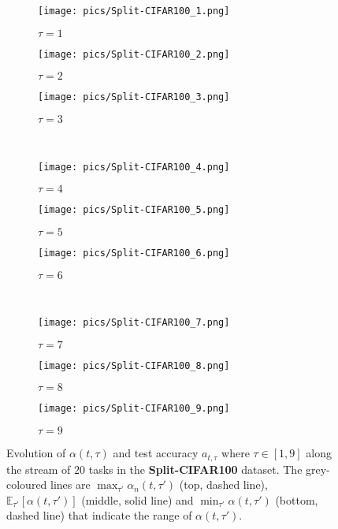 \documentclass{article} \usepackage{collas2022_conference,times}
\begin{document}
    \begin{figure*}[t!]
        \centering
        \begin{subfigure}[b]{0.32\textwidth}
            \texttt{[image: pics/Split-CIFAR100\_1.png]}\caption{$\tau=1$}
        \end{subfigure}
        \hfill
        \begin{subfigure}[b]{0.32\textwidth}
            \texttt{[image: pics/Split-CIFAR100\_2.png]}\caption{$\tau=2$}
        \end{subfigure}
        \hfill
        \begin{subfigure}[b]{0.32\textwidth}
            \texttt{[image: pics/Split-CIFAR100\_3.png]}\caption{$\tau=3$}
        \end{subfigure}
        \\
        \begin{subfigure}[b]{0.32\textwidth}
            \texttt{[image: pics/Split-CIFAR100\_4.png]}\caption{$\tau=4$}
        \end{subfigure}
        \hfill
        \begin{subfigure}[b]{0.32\textwidth}
            \texttt{[image: pics/Split-CIFAR100\_5.png]}\caption{$\tau=5$}
        \end{subfigure}
        \hfill
        \begin{subfigure}[b]{0.32\textwidth}
            \texttt{[image: pics/Split-CIFAR100\_6.png]}\caption{$\tau=6$}
        \end{subfigure}
        \\
        \begin{subfigure}[b]{0.32\textwidth}
            \texttt{[image: pics/Split-CIFAR100\_7.png]}\caption{$\tau=7$}
        \end{subfigure}
        \hfill
        \begin{subfigure}[b]{0.32\textwidth}
            \texttt{[image: pics/Split-CIFAR100\_8.png]}\caption{$\tau=8$}
        \end{subfigure}
        \hfill
        \begin{subfigure}[b]{0.32\textwidth}
            \texttt{[image: pics/Split-CIFAR100\_9.png]}\caption{$\tau=9$}
        \end{subfigure}
        \caption{Evolution of $\alpha(t,\tau)$ and test accuracy $a_{t,\tau}$ where $\tau \in [1,9]$ along the stream of $20$ tasks in the \textbf{Split-CIFAR100} dataset. The grey-coloured lines are $\max_{\tau'} \alpha_n(t,\tau')$  (top, dashed line), $\mathbb{E}_{\tau'} [\alpha(t,\tau')]$  (middle, solid line) and $\min_{\tau'} \alpha(t,\tau')$  (bottom, dashed line) that indicate the range of $\alpha(t,\tau')$. }
        \label{alpha_cifar_app}
    \end{figure*}
\end{document}
